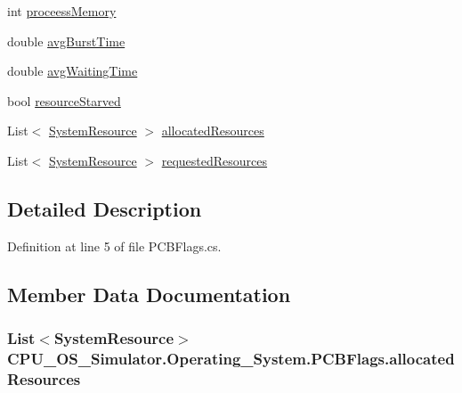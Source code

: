 \begin{DoxyCompactItemize}
\item 
int \hyperlink{struct_c_p_u___o_s___simulator_1_1_operating___system_1_1_p_c_b_flags_a4248a993bf5be874fcd2843269bb9058}{proceess\+Memory}
\item 
double \hyperlink{struct_c_p_u___o_s___simulator_1_1_operating___system_1_1_p_c_b_flags_a1c7b8ae576214d5e26c37727b15b8833}{avg\+Burst\+Time}
\item 
double \hyperlink{struct_c_p_u___o_s___simulator_1_1_operating___system_1_1_p_c_b_flags_ae6d30d555620b4fe5a92baea4ad933d1}{avg\+Waiting\+Time}
\item 
bool \hyperlink{struct_c_p_u___o_s___simulator_1_1_operating___system_1_1_p_c_b_flags_ad9a23e852aa137ab0289efebb5645b19}{resource\+Starved}
\item 
List$<$ \hyperlink{class_c_p_u___o_s___simulator_1_1_operating___system_1_1_system_resource}{System\+Resource} $>$ \hyperlink{struct_c_p_u___o_s___simulator_1_1_operating___system_1_1_p_c_b_flags_a204cecda661767e690738e40b127a8f0}{allocated\+Resources}
\item 
List$<$ \hyperlink{class_c_p_u___o_s___simulator_1_1_operating___system_1_1_system_resource}{System\+Resource} $>$ \hyperlink{struct_c_p_u___o_s___simulator_1_1_operating___system_1_1_p_c_b_flags_a74e802e68397e53df4bd3206888fac9f}{requested\+Resources}
\end{DoxyCompactItemize}


\subsection{Detailed Description}


Definition at line 5 of file P\+C\+B\+Flags.\+cs.



\subsection{Member Data Documentation}
\hypertarget{struct_c_p_u___o_s___simulator_1_1_operating___system_1_1_p_c_b_flags_a204cecda661767e690738e40b127a8f0}{}
\subsubsection[{allocated\+Resources}]{\setlength{\rightskip}{0pt plus 5cm}List$<${\bf System\+Resource}$>$ C\+P\+U\+\_\+\+O\+S\+\_\+\+Simulator.\+Operating\+\_\+\+System.\+P\+C\+B\+Flags.\+allocated\+Resources}\label{struct_c_p_u___o_s___simulator_1_1_operating___system_1_1_p_c_b_flags_a204cecda661767e690738e40b127a8f0}



